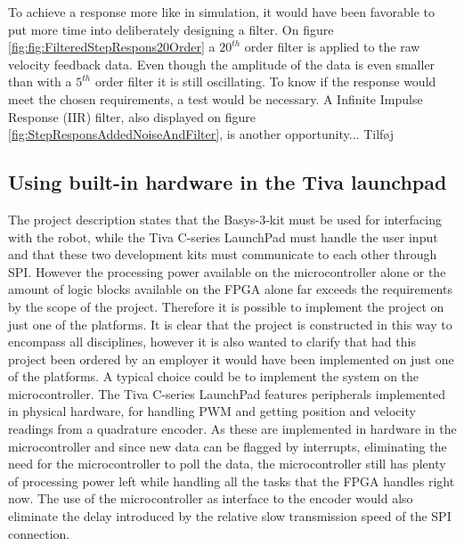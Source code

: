 \documentclass[../../main.tex]{subfiles}
\begin{document}
To achieve a response more like in simulation, it would have been favorable to put more time into deliberately designing a filter. On figure \ref{fig:fig:FilteredStepRespons20Order} a $20^{th}$ order filter is applied to the raw velocity feedback data. Even though the amplitude of the data is even smaller than with a $5^{th}$ order filter it is still oscillating. To know if the response would meet the chosen requirements, a test would be necessary. A Infinite Impulse Response (IIR) filter, also displayed on figure \ref{fig:StepResponsAddedNoiseAndFilter}, is another opportunity... Tilføj






\subsection*{Using built-in hardware in the Tiva launchpad}
The project description states that the Basys-3-kit must be used for interfacing with the robot, while the Tiva C-series LaunchPad must handle the user input and that these two development kits must communicate to each other through SPI. However the processing power available on the microcontroller alone or the amount of logic blocks available on the FPGA alone far exceeds the requirements by the scope of the project. Therefore it is possible to implement the project on just one of the platforms. It is clear that the project is constructed in this way to encompass all disciplines, however it is also wanted to clarify that had this project been ordered by an employer it would have been implemented on just one of the platforms. A typical choice could be to implement the system on the microcontroller. The Tiva C-series LaunchPad features peripherals implemented in physical hardware, for handling PWM and getting position and velocity readings from a quadrature encoder. As these are implemented in hardware in the microcontroller and since new data can be flagged by interrupts, eliminating the need for the microcontroller to poll the data, the microcontroller still has plenty of processing power left while handling all the tasks that the FPGA handles right now. The use of the microcontroller as interface to the encoder would also eliminate the delay introduced by the relative slow transmission speed of the SPI connection.      

\end{document}
